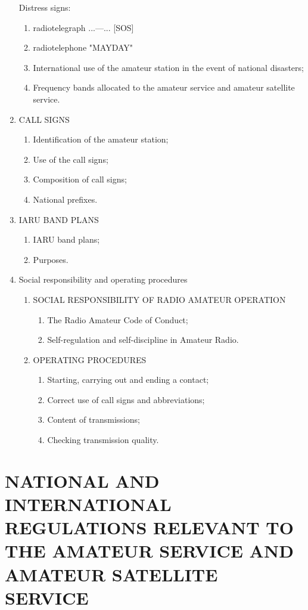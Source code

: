 \begin{enumerate}[noitemsep]
Distress signs:
\begin{enumerate}
\item radiotelegraph ...---... [SOS]
\item radiotelephone "MAYDAY"
\item International use of the amateur station in the event of national disasters;
\item Frequency bands allocated to the amateur service and amateur satellite service.
\end{enumerate}
\item CALL SIGNS
\begin{enumerate}
\item Identification of the amateur station;
\item Use of the call signs;
\item Composition of call signs;
\item National prefixes.
\end{enumerate}
\item IARU BAND PLANS
\begin{enumerate}
\item IARU band plans;
\item Purposes.
\end{enumerate}
\item Social responsibility and operating procedures
\begin{enumerate}
\item SOCIAL RESPONSIBILITY OF RADIO AMATEUR OPERATION
\begin{enumerate}
\item The Radio Amateur Code of Conduct; 
\item Self-regulation and self-discipline in Amateur Radio.
\end{enumerate}
\item OPERATING PROCEDURES
\begin{enumerate}
\item Starting, carrying out and ending a contact;
\item Correct use of call signs and abbreviations;
\item Content of transmissions;
\item Checking transmission quality.
\end{enumerate}
\end{enumerate}

\end{enumerate}

\section{NATIONAL AND INTERNATIONAL REGULATIONS RELEVANT TO THE AMATEUR SERVICE AND AMATEUR SATELLITE SERVICE}

